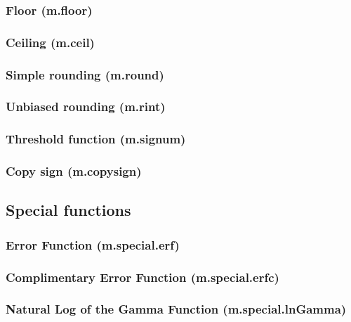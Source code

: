 \documentclass{article}
\theoremstyle{definition}
\begin{document}
\subsubsection{Floor (m.floor)}

\subsubsection{Ceiling (m.ceil)}

\subsubsection{Simple rounding (m.round)}

\subsubsection{Unbiased rounding (m.rint)}

\subsubsection{Threshold function (m.signum)}

\subsubsection{Copy sign (m.copysign)}

\subsection{Special functions}

\subsubsection{Error Function (m.special.erf)}

\subsubsection{Complimentary Error Function (m.special.erfc)}

\subsubsection{Natural Log of the Gamma Function (m.special.lnGamma)}
\end{document}

